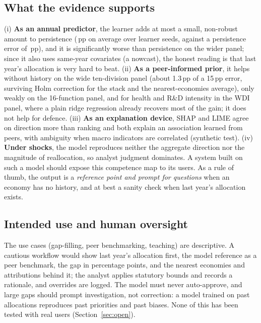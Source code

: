 \subsection{What the evidence supports}
(i) \textbf{As an annual predictor}, the learner adds at most a small, non-robust amount to persistence (\AnnSeedMeanGain\,pp on average over learner seeds, against a persistence error of \ResTVDPersist\,pp), and it is significantly worse than persistence on the wider panel; since it also uses same-year covariates (a nowcast), the honest reading is that last year's allocation is very hard to beat. (ii) \textbf{As a peer-informed prior}, it helps without history on the wide ten-division panel (about 1.3\,pp of a 15\,pp error, surviving Holm correction for the stack and the nearest-economies average), only weakly on the 16-function panel, and for health and R\&D intensity in the WDI panel, where a plain ridge regression already recovers most of the gain; it does not help for defence. (iii) \textbf{As an explanation device}, SHAP and LIME agree on direction more than ranking and both explain an association learned from peers, with ambiguity when macro indicators are correlated (synthetic test). (iv) \textbf{Under shocks}, the model reproduces neither the aggregate direction nor the magnitude of reallocation, so analyst judgment dominates. A system built on such a model should expose this competence map to its users. As a rule of thumb, the output is a \emph{reference point and prompt for questions} when an economy has no history, and at best a sanity check when last year's allocation exists.

\subsection{Intended use and human oversight}
The use cases (gap-filling, peer benchmarking, teaching) are descriptive. A cautious workflow would show last year's allocation first, the model reference as a peer benchmark, the gap in percentage points, and the nearest economies and attributions behind it; the analyst applies statutory bounds and records a rationale, and overrides are logged. The model must never auto-approve, and large gaps should prompt investigation, not correction: a model trained on past allocations reproduces past priorities and past biases. None of this has been tested with real users (Section~\ref{sec:open}).


